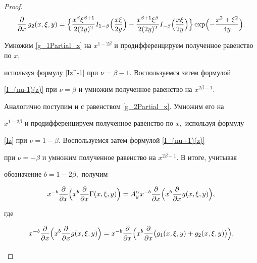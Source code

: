 \begin{proof}
\begin{equation}
\frac{\partial}{\partial x}\,g_2(x,\xi,y)=

\Bigl\{

\frac{x^{\beta}\xi^{\beta+1}}{2 (2y)^2} I_{1-\beta}\Bigl(\frac{x\xi}{2y}\Bigr)-

\frac{x^{\beta+1}\xi^{\beta}}{2 (2y)^2} I_{-\beta}\Bigl(\frac{x\xi}{2y}\Bigr)\Bigr\}\exp \Bigl({-\frac{x^2+\xi^2}{4y}}\Bigr).

\end{equation}

Умножим \eqref{g_1Partial_x} на $x^{1-2\beta}$ и продифференцируем полученное равенство по $x,$

используя формулу  \eqref{Iz^-1} при $\nu=\beta-1.$  Воспользуемся затем формулой 

\eqref{I_(nu-1)(z)} при $\nu=\beta$ и умножим полученное равенство на $x^{2\beta-1}.$

Аналогично поступим и с равенством \eqref{g_2Partial_x}. Умножим его на 

$x^{1-2\beta}$ и продифференцируем полученное равенство по $x,$ используя формулу 

\eqref{Iz}  при  $\nu=1-\beta.$ Воспользуемся затем формулой   \eqref{I_(nu+1)(z)}

 при $\nu=-\beta$ и умножим полученное равенство на $x^{2\beta-1}.$ В итоге, учитывая 

обозначение $b=1-2\beta,$ получим

\begin{equation}\label{GammaPartial_xx}

x^{-b} 

\frac{\partial}{\partial x}\Bigl(x^{b}

\frac{\partial}{\partial x} \Gamma(x,\xi,y)\Bigr)=

A^{\alpha}_{y} x^{-b} \frac{\partial}{\partial x}\Bigl(x^{b}\frac{\partial}{\partial x} g(x,\xi,y)\Bigr),

\end{equation}

где

$$

x^{-b} \frac{\partial}{\partial x}\Bigl(x^{b}\frac{\partial  }{\partial x} g(x,\xi,y)

\Bigr)=

x^{-b} \frac{\partial}{\partial x}\Bigl(x^{b}\frac{\partial}{\partial x} \bigl(g_1(x,\xi,y)+g_2(x,\xi,y)\bigr)\Bigr),

$$

\begin{multline}


\end{multline}
\end{proof}
